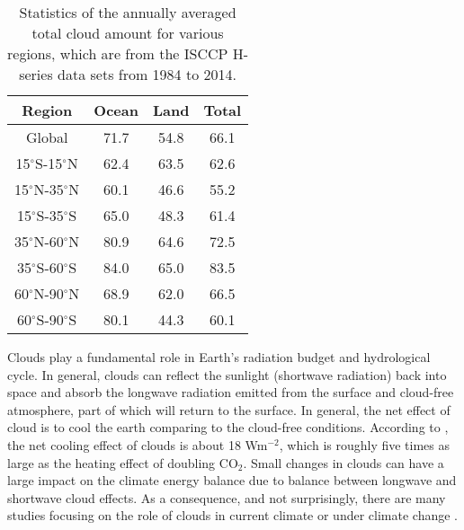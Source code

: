\begin{table}[htp]
\centering
\caption{Statistics of the annually averaged total cloud amount for various regions, which are from the ISCCP H-series data sets \citep{Young2018} from 1984 to 2014.}
\vspace{0.5em}
\begin{tabular}{cccc}
	\toprule
	Region & Ocean & Land &  Total\\
	\midrule
	Global & 71.7 & 54.8 & 66.1 \\
	15$^\circ$S-15$^\circ$N&  62.4&  63.5& 62.6 \\
	15$^\circ$N-35$^\circ$N&  60.1&  46.6& 55.2\\
	15$^\circ$S-35$^\circ$S&  65.0&  48.3& 61.4\\
	35$^\circ$N-60$^\circ$N&  80.9&  64.6& 72.5 \\
	35$^\circ$S-60$^\circ$S&  84.0&  65.0& 83.5 \\
	60$^\circ$N-90$^\circ$N&  68.9&  62.0& 66.5\\
	60$^\circ$S-90$^\circ$S&  80.1&  44.3& 60.1 \\
	\bottomrule
\end{tabular}
\label{tab:statistics_cld_amt}
\end{table}

Clouds play a fundamental role in Earth's radiation budget and hydrological cycle. In general, clouds can reflect the sunlight (shortwave radiation) back into space and absorb the longwave radiation emitted from the surface and cloud-free atmosphere, part of which will return to the surface. In general, the net effect of cloud is to cool the earth comparing to the cloud-free conditions. According to \cite{Zelinka2017}, the net cooling effect of clouds is about 18 Wm$^{-2}$, which is roughly five times as large as the heating effect of doubling CO$_2$. Small changes in clouds can have a large impact on the climate energy balance due to balance between longwave and shortwave cloud effects. As a consequence, and not surprisingly, there are many studies focusing on the role of clouds in current climate or under climate change \citep[e.g.,][]{Cess1990intercomparison,Zelinka2017}.


